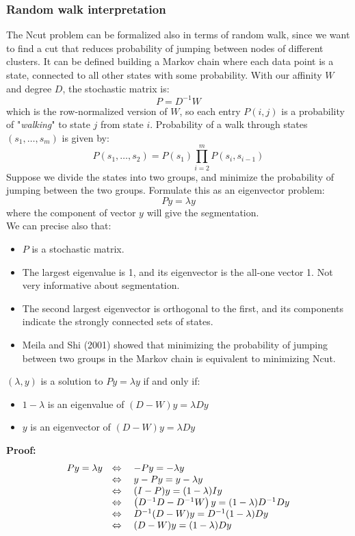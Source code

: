 \subsubsection{Random walk interpretation} 
The Ncut problem can be formalized also in terms of random walk, since we want to find a cut that reduces probability of jumping between nodes of different clusters. It can be defined building a Markov chain where each data point is a state, connected to all other states with some probability. With our affinity $W$ and degree $D$, the stochastic matrix is:
$$P=D^{-1}W$$
which is the row-normalized version of $W$, so each entry $P(i,j)$ is a probability of "\textit{walking}" to state $j$ from state $i$.
Probability of a walk through states $( s _ { 1 } , \dots , s _ { m })$ is given by:
$$P \left( s _ { 1 } , \ldots , s _ { 2 } \right) = P \left( s _ { 1 } \right) \prod _ { i = 2 } ^ { m } P \left( s _ { i } , s _ { i - 1 } \right)$$
Suppose we divide the states into two groups, and minimize the probability of jumping between the two groups. Formulate this as an eigenvector problem:
$$P y = \lambda y$$
where the component of vector $y$ will give the segmentation.\\
We can precise also that:
\begin{itemize}
	\item $P$ is a stochastic matrix.
	\item The largest eigenvalue is 1, and its eigenvector is the all-one vector 1. Not very informative about segmentation.
	\item The second largest eigenvector is orthogonal to the first, and its components indicate the strongly connected sets of states.
	\item Meila and Shi (2001) showed that minimizing the probability of jumping between two groups in the Markov chain is equivalent to minimizing Ncut.
\end{itemize}
\begin{thm} $(\lambda, y)$ is a solution to $Py = \lambda y$ if and only if:
	\begin{itemize}
		\item $1-\lambda$ is an eigenvalue of $(D-W)y = \lambda D y$
		\item $y$ is an eigenvector of $(D-W)y = \lambda Dy$
	\end{itemize} 
	\textbf{Proof:}
	$$\begin{array} { l l } { P y = \lambda y } & { \Leftrightarrow \quad - P y = - \lambda y } \\
	 { } & { \Leftrightarrow \quad y - P y = y - \lambda y } \\
	 { } & { \Leftrightarrow \quad ( I - P ) y = ( 1 - \lambda ) I y } \\
	 { } & { \Leftrightarrow \quad \left( D ^ { - 1 } D - D ^ { - 1 } W \right) y = ( 1 - \lambda ) D ^ { - 1 } D y } \\
	 { } & { \Leftrightarrow \quad D ^ { - 1 } ( D - W ) y = D ^ { - 1 } ( 1 - \lambda ) D y } \\
	 { } & { \Leftrightarrow \quad ( D - W ) y = ( 1 - \lambda ) D y } \end{array}$$
\end{thm}
